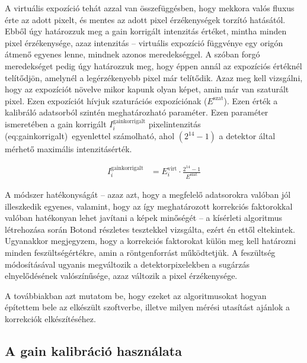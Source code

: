 \documentclass[a4paper,12pt]{article}
\begin{document}
 A virtuális expozíció tehát azzal van összefüggésben, hogy mekkora valós fluxus érte az adott pixelt, és mentes az adott pixel érzékenységek torzító hatásától. Ebből úgy határozzuk meg a gain korrigált intenzitás értéket, mintha minden pixel érzékenysége, azaz intenzitás -- virtuális expozíció függvénye egy origón átmenő egyenes lenne, mindnek azonos meredekséggel. A szóban forgó meredekséget pedig úgy határozzuk meg, hogy éppen annál az expozíciós értéknél telítődjön, amelynél a legérzékenyebb pixel már telítődik. Azaz meg kell vizsgálni, hogy az expozíciót növelve mikor kapunk olyan képet, amin már van szaturált pixel. Ezen expozíciót hívjuk szaturációs expozíciónak ($E^\text{szat}$). Ezen érték a kalibráló adatsorból szintén meghatározható paraméter. Ezen paraméter ismeretében a gain korrigált $ I_i^{\text{gainkorrigalt}}$ pixelintenzitás \aref({eq:gainkorrigalt})~egyenlettel számolható, ahol $\left(2^{14} -1\right)$ a detektor által mérhető maximális intenzitásérték.

\begin{equation}
\label{eq:gainkorrigalt}
\begin{split}
 I_i^{\text{gainkorrigalt}} &= E_i^{\text{virt}}  \cdot \frac{2^{14} -1}{E^\text{szat}}
 \end{split}
\end{equation}


A módszer hatékonyságát -- azaz azt, hogy a megfelelő adatsorokra valóban jól illeszkedik egyenes, valamint, hogy az így meghatározott korrekciós faktorokkal valóban hatékonyan lehet javítani a képek minőségét -- a kísérleti algoritmus létrehozása során Botond részletes tesztekkel vizsgálta, ezért én ettől eltekintek. Ugyanakkor megjegyzem, hogy a korrekciós faktorokat külön meg kell határozni minden feszültségértékre, amin a röntgenforrást működtetjük. A feszültség módosításával ugyanis megváltozik a detektorpixelekben a sugárzás elnyelődésének valószínűsége, azaz változik a pixel érzékenysége.


A továbbiakban azt mutatom be, hogy ezeket az algoritmusokat hogyan építettem bele az elkészült szoftverbe, illetve milyen mérési utasítást ajánlok a korrekciók elkészítéséhez.


\subsection{A gain kalibráció használata}
\end{document}
